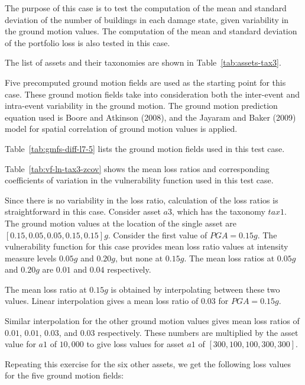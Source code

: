 The purpose of this case is to test the computation of the mean and standard deviation of the number of buildings in each damage state, given variability in the ground motion values. The computation of the mean and standard deviation of the portfolio loss is also tested in this case.


The list of assets and their taxonomies are shown in Table~\ref{tab:assets-tax3}.

Five precomputed ground motion fields are used as the starting point for this case. These ground motion fields take into consideration both the inter-event and intra-event variability in the ground motion. The ground motion prediction equation used is Boore and Atkinson (2008), and the Jayaram and Baker (2009) model for spatial correlation of ground motion values is applied.



Table~\ref{tab:gmfs-diff-l7-5} lists the ground motion fields used in this test case.




Table~\ref{tab:vf-ln-tax3-zcov} shows the mean loss ratios and corresponding coefficients of variation in the vulnerability function used in this test case.

Since there is no variability in the loss ratio, calculation of the loss ratios is straightforward in this case. Consider asset $a3$, which has the taxonomy $tax1$.  The ground motion values at the location of the single asset are $[0.15, 0.05, 0.05, 0.15, 0.15] g$. Consider the first value of $PGA = 0.15 g$. The vulnerability function for this case provides mean loss ratio values at intensity measure levels $0.05 g$ and $0.20 g$, but none at $0.15 g$. The mean loss ratios at $0.05 g$ and $0.20 g$ are $0.01$ and $0.04$ respectively.

The mean loss ratio at $0.15 g$ is obtained by interpolating between these two values. Linear interpolation gives a mean loss ratio of $0.03$ for $PGA = 0.15 g$.

Similar interpolation for the other ground motion values gives mean loss ratios of $0.01$, $0.01$, $0.03$, and $0.03$ respectively. These numbers are multiplied by the asset value for $a1$ of $10,000$ to give loss values for asset $a1$ of $[300, 100, 100, 300, 300]$.

Repeating this exercise for the six other assets, we get the following loss values for the five ground motion fields:


